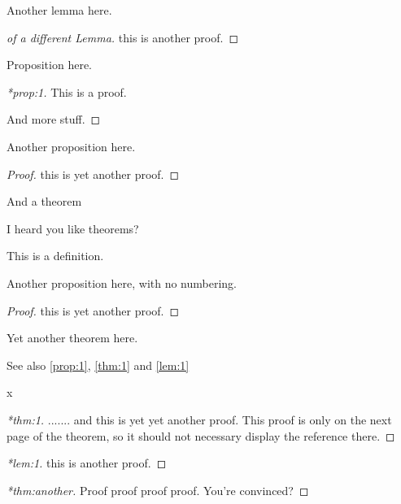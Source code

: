 \documentclass[12pt,a5paper]{article}
\begin{document}
\begin{lemma}
\label{lem:1}
Another lemma here.
\end{lemma}
\begin{proof}[of a different Lemma]
  this is another proof.
\end{proof}


\begin{proposition}
  \label{prop:1}
  Proposition here.
\end{proposition}
\begin{proof}[*prop:1]
  This is a proof.

  And more stuff.
\end{proof}


\begin{proposition}
\noproofref
Another proposition here.
\end{proposition}
\begin{proof}
  this is yet another proof.
\end{proof}


\begin{theorem}
\label{thm:1}
And a theorem
\end{theorem}


\begin{theorem}
\noproofref
\label{thm:2}
I heard you like theorems?
\end{theorem}

\begin{definition*}
\label{def:1}
This is a definition.
\end{definition*}


\begin{proposition*}
Another proposition here, with no numbering.
\end{proposition*}
\begin{proof}
  this is yet another proof.
\end{proof}

\begin{theorem}
  \label{thm:another}
  Yet another theorem here.
\end{theorem}


See also \autoref{prop:1}, \autoref{thm:1} and \autoref{lem:1}

\cleardoublepage
x
\begin{proof}[*thm:1]
  ....... and this is yet yet another proof.  This proof is only on the next page of the
  theorem, so it should not necessary display the reference there.
\end{proof}

\cleardoublepage

\begin{proof}[*lem:1]
  this is another proof.
\end{proof}

\cleardoublepage

\begin{proof}[*thm:another]
  Proof proof proof proof. You're convinced?
\end{proof}
\end{document}
